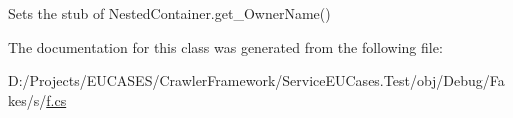 Sets the stub of Nested\-Container.\-get\-\_\-\-Owner\-Name()



The documentation for this class was generated from the following file\-:\begin{DoxyCompactItemize}
\item 
D\-:/\-Projects/\-E\-U\-C\-A\-S\-E\-S/\-Crawler\-Framework/\-Service\-E\-U\-Cases.\-Test/obj/\-Debug/\-Fakes/s/\hyperlink{s_2f_8cs}{f.\-cs}\end{DoxyCompactItemize}
